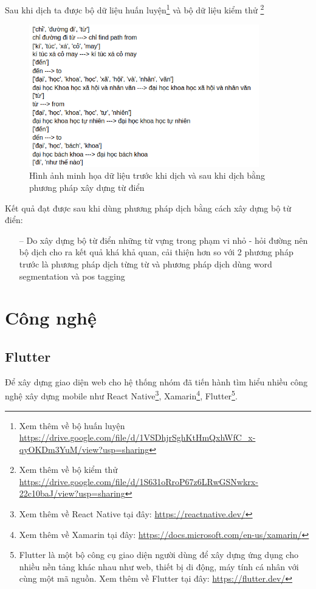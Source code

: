 Sau khi dịch ta được bộ dữ liệu huấn luyện\footnote{Xem thêm về bộ huấn luyện \url{https://drive.google.com/file/d/1VSDhjrSghKtHmQxhWfC_x-qyOKDm3YuM/view?usp=sharing}} và bộ dữ liệu kiểm thử \footnote{Xem thêm về bộ kiểm thử \url{https://drive.google.com/file/d/1S631oRroP67z6LRwGSNwkrx-22c10baJ/view?usp=sharing}}
\begin{figure}[htp]
    \centering
    \includegraphics[width=10cm]{images/trainingdata-tudien.png}
    \caption{Hình ảnh minh họa dữ liệu trước khi dịch và sau khi dịch bằng phương pháp xây dựng từ điển}
    \label{fig:trainingdata-tudien}

\end{figure}


Kết quả đạt được sau khi dùng phương pháp dịch bằng cách xây dựng bộ từ điển:
\begin{itemize}
    \item[--] Do xây dựng bộ từ điển những từ vựng trong phạm vi nhỏ - hỏi đường nên bộ dịch cho ra kết quả khá khả quan, cải thiện hơn so với 2 phương pháp trước là phương pháp dịch từng từ và phương pháp dịch dùng word segmentation và pos tagging
\end{itemize}

\section{Công nghệ}

\subsection{Flutter}
Để xây dựng giao diện web cho hệ thống nhóm đã tiến hành tìm hiểu nhiều công nghệ xây dựng mobile như React Native\footnote{Xem thêm về React Native tại đây: \url{https://reactnative.dev/}}, Xamarin\footnote{Xem thêm về Xamarin tại đây: \url{https://docs.microsoft.com/en-us/xamarin/}}, Flutter\footnote{Flutter là một bộ công cụ giao diện người dùng để xây dựng ứng dụng cho nhiều nền tảng khác nhau như web, thiết bị di động, máy tính cá nhân với cùng một mã nguồn. Xem thêm về Flutter tại đây: \url{https://flutter.dev/}}.

